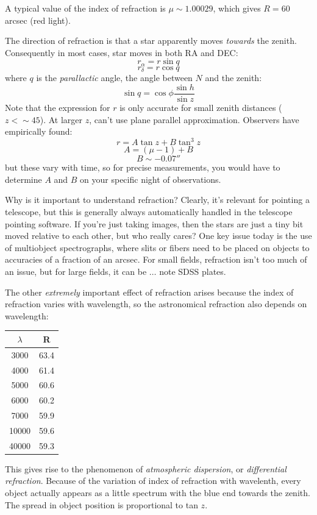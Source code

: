 \documentclass[12pt]{article}
\begin{document}
A typical value of the index of refraction is $\mu \sim 1.00029$, which
gives $R = 60$ arcsec (red light).

The direction of refraction is that a star apparently moves
\emph{towards}
the zenith. Consequently in most cases, star moves in both RA and DEC:
    $$ r_{\alpha} = r\sin q $$
    $$ r_{\delta} = r\cos q $$
where $q$ is the \emph{parallactic} angle, the angle between $N$ and
the zenith:
    $$ \sin q = \cos\phi\frac{\sin h}{\sin z} $$
Note that the expression for $r$ is only accurate for small zenith
distances ($z < \sim 45$). At larger $z$, can't use plane parallel
approximation. Observers have empirically found:
    $$ r = A\tan z + B\tan^3z $$
    $$ A = (\mu - 1) + B $$
    $$ B \sim -0.07'' $$
but these vary with time, so for precise measurements, you would have
to determine $A$ and $B$ on your specific night of observations.

Why is it important to understand refraction? Clearly, it's relevant
for pointing a telescope, but this is generally always automatically
handled in the telescope pointing software. If you're just taking
images, then the stars are just a tiny bit moved relative to each
other, but who really cares? One key issue today is the use of
multiobject spectrographs, where slits or fibers need to be placed on
objects to accuracies of a fraction of an arcsec. For small fields,
refraction isn't too much of an issue, but for large fields, it can be
$\ldots$ note SDSS plates.

The other \emph{extremely} important effect of refraction arises because the
index of refraction varies with wavelength, so the astronomical
refraction also depends on wavelength:
\begin{table}[h]
    \centering
    \begin{tabular}{c c}
    \hline\hline
    $\lambda$ & R\\
    \hline
    3000 & 63.4\\
    4000 & 61.4\\
    5000 & 60.6\\
    6000 & 60.2\\
    7000 & 59.9\\
    10000 & 59.6\\
    40000 & 59.3\\
    \hline
    \end{tabular}
\end{table}
This gives rise to the phenomenon of \emph{atmospheric dispersion}, or
\emph{differential refraction}. Because of the variation of index of
refraction with wavelenth, every object actually appears as a little
spectrum with the blue end towards the zenith. The spread in object
position is proportional to tan $z$.
\end{document}
